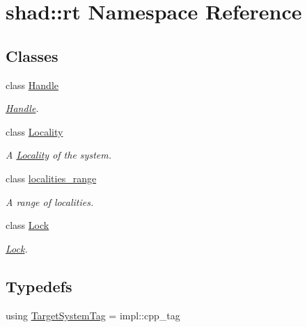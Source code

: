 \hypertarget{namespaceshad_1_1rt}{\section{shad\-:\-:rt Namespace Reference}
\label{namespaceshad_1_1rt}
}
\subsection*{Classes}
\begin{DoxyCompactItemize}
\item 
class \hyperlink{classshad_1_1rt_1_1Handle}{Handle}
\begin{DoxyCompactList}\small\item\em \hyperlink{classshad_1_1rt_1_1Handle}{Handle}. \end{DoxyCompactList}\item 
class \hyperlink{classshad_1_1rt_1_1Locality}{Locality}
\begin{DoxyCompactList}\small\item\em A \hyperlink{classshad_1_1rt_1_1Locality}{Locality} of the system. \end{DoxyCompactList}\item 
class \hyperlink{classshad_1_1rt_1_1localities__range}{localities\-\_\-range}
\begin{DoxyCompactList}\small\item\em A range of localities. \end{DoxyCompactList}\item 
class \hyperlink{classshad_1_1rt_1_1Lock}{Lock}
\begin{DoxyCompactList}\small\item\em \hyperlink{classshad_1_1rt_1_1Lock}{Lock}. \end{DoxyCompactList}\end{DoxyCompactItemize}
\subsection*{Typedefs}
\begin{DoxyCompactItemize}
\item 
using \hyperlink{namespaceshad_1_1rt_a1eb8df1be67eada9b4f647ff376695b0}{Target\-System\-Tag} = impl\-::cpp\-\_\-tag
\end{DoxyCompactItemize}

